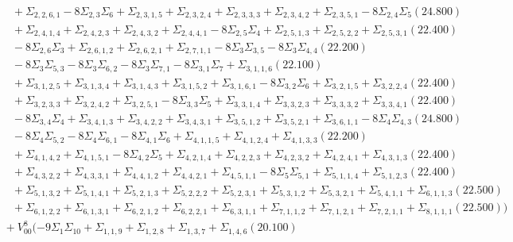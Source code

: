 \documentclass[12pt]{article}
\begin{document}
\begin{landscape}
\begin{align*}
		&\quad\quad +\Sigma_{2,2,6,1}-8\Sigma_{2,3}\Sigma_{6}+\Sigma_{2,3,1,5}+\Sigma_{2,3,2,4}+\Sigma_{2,3,3,3}+\Sigma_{2,3,4,2}+\Sigma_{2,3,5,1}-8\Sigma_{2,4}\Sigma_{5}(24.800) \\ 
		&\quad\quad +\Sigma_{2,4,1,4}+\Sigma_{2,4,2,3}+\Sigma_{2,4,3,2}+\Sigma_{2,4,4,1}-8\Sigma_{2,5}\Sigma_{4}+\Sigma_{2,5,1,3}+\Sigma_{2,5,2,2}+\Sigma_{2,5,3,1}(22.400) \\ 
		&\quad\quad -8\Sigma_{2,6}\Sigma_{3}+\Sigma_{2,6,1,2}+\Sigma_{2,6,2,1}+\Sigma_{2,7,1,1}-8\Sigma_{3}\Sigma_{3,5}-8\Sigma_{3}\Sigma_{4,4}(22.200) \\ 
		&\quad\quad -8\Sigma_{3}\Sigma_{5,3}-8\Sigma_{3}\Sigma_{6,2}-8\Sigma_{3}\Sigma_{7,1}-8\Sigma_{3,1}\Sigma_{7}+\Sigma_{3,1,1,6}(22.100) \\ 
		&\quad\quad +\Sigma_{3,1,2,5}+\Sigma_{3,1,3,4}+\Sigma_{3,1,4,3}+\Sigma_{3,1,5,2}+\Sigma_{3,1,6,1}-8\Sigma_{3,2}\Sigma_{6}+\Sigma_{3,2,1,5}+\Sigma_{3,2,2,4}(22.400) \\ 
		&\quad\quad +\Sigma_{3,2,3,3}+\Sigma_{3,2,4,2}+\Sigma_{3,2,5,1}-8\Sigma_{3,3}\Sigma_{5}+\Sigma_{3,3,1,4}+\Sigma_{3,3,2,3}+\Sigma_{3,3,3,2}+\Sigma_{3,3,4,1}(22.400) \\ 
		&\quad\quad -8\Sigma_{3,4}\Sigma_{4}+\Sigma_{3,4,1,3}+\Sigma_{3,4,2,2}+\Sigma_{3,4,3,1}+\Sigma_{3,5,1,2}+\Sigma_{3,5,2,1}+\Sigma_{3,6,1,1}-8\Sigma_{4}\Sigma_{4,3}(24.800) \\ 
		&\quad\quad -8\Sigma_{4}\Sigma_{5,2}-8\Sigma_{4}\Sigma_{6,1}-8\Sigma_{4,1}\Sigma_{6}+\Sigma_{4,1,1,5}+\Sigma_{4,1,2,4}+\Sigma_{4,1,3,3}(22.200) \\ 
		&\quad\quad +\Sigma_{4,1,4,2}+\Sigma_{4,1,5,1}-8\Sigma_{4,2}\Sigma_{5}+\Sigma_{4,2,1,4}+\Sigma_{4,2,2,3}+\Sigma_{4,2,3,2}+\Sigma_{4,2,4,1}+\Sigma_{4,3,1,3}(22.400) \\ 
		&\quad\quad +\Sigma_{4,3,2,2}+\Sigma_{4,3,3,1}+\Sigma_{4,4,1,2}+\Sigma_{4,4,2,1}+\Sigma_{4,5,1,1}-8\Sigma_{5}\Sigma_{5,1}+\Sigma_{5,1,1,4}+\Sigma_{5,1,2,3}(22.400) \\ 
		&\quad\quad +\Sigma_{5,1,3,2}+\Sigma_{5,1,4,1}+\Sigma_{5,2,1,3}+\Sigma_{5,2,2,2}+\Sigma_{5,2,3,1}+\Sigma_{5,3,1,2}+\Sigma_{5,3,2,1}+\Sigma_{5,4,1,1}+\Sigma_{6,1,1,3}(22.500) \\ 
		&\quad\quad +\Sigma_{6,1,2,2}+\Sigma_{6,1,3,1}+\Sigma_{6,2,1,2}+\Sigma_{6,2,2,1}+\Sigma_{6,3,1,1}+\Sigma_{7,1,1,2}+\Sigma_{7,1,2,1}+\Sigma_{7,2,1,1}+\Sigma_{8,1,1,1}(22.500) ) \\
		&\quad\; +V_{00}^{8}(-9\Sigma_{1}\Sigma_{10}+\Sigma_{1,1,9}+\Sigma_{1,2,8}+\Sigma_{1,3,7}+\Sigma_{1,4,6}(20.100) \\ 

\end{align*}
\end{landscape}
\end{document}
